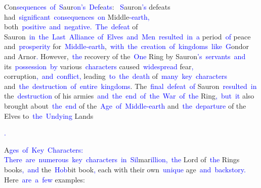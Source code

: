 \documentclass{article}
\begin{document}
\begin{tcolorbox}[colframe=black,colback=white]
{}Con\textcolor{blue}{sequences}\textcolor{blue}{~of}\textcolor{blue}{~S}aur\textcolor{blue}{on}\textcolor{blue}{'s}\textcolor{blue}{~Def}e\textcolor{blue}{ats}:\textcolor{blue}{~
}\textcolor{blue}{S}auron\textcolor{blue}{'s} defeats had\textcolor{blue}{~significant}\textcolor{blue}{~consequences}\textcolor{blue}{~on} Middle\textcolor{blue}{-earth}\textcolor{blue}{,} both\textcolor{blue}{~positive}\textcolor{blue}{~and}\textcolor{blue}{~negative}\textcolor{blue}{.}\textcolor{blue}{~The}\textcolor{blue}{~defeat} of Sauron\textcolor{blue}{~in}\textcolor{blue}{~the}\textcolor{blue}{~Last}\textcolor{blue}{~Alliance}\textcolor{blue}{~of}\textcolor{blue}{~Elves}\textcolor{blue}{~and}\textcolor{blue}{~Men}\textcolor{blue}{~resulted}\textcolor{blue}{~in}\textcolor{blue}{~a} period\textcolor{blue}{~of} peace and\textcolor{blue}{~prosperity} for\textcolor{blue}{~Middle}\textcolor{blue}{-earth},\textcolor{blue}{~with}\textcolor{blue}{~the}\textcolor{blue}{~creation}\textcolor{blue}{~of}\textcolor{blue}{~kingdoms}\textcolor{blue}{~like}\textcolor{blue}{~G}ondor and Arnor\textcolor{blue}{.} However,\textcolor{blue}{~the} recovery of the\textcolor{blue}{~One} Ring by Sauron\textcolor{blue}{'s}\textcolor{blue}{~servants}\textcolor{blue}{~and} its\textcolor{blue}{~possession}\textcolor{blue}{~by} various\textcolor{blue}{~characters} caused\textcolor{blue}{~widespread} fear\textcolor{blue}{,} corruption\textcolor{blue}{,}\textcolor{blue}{~and}\textcolor{blue}{~conflict}\textcolor{blue}{,} leading\textcolor{blue}{~to}\textcolor{blue}{~the}\textcolor{blue}{~death} of\textcolor{blue}{~many}\textcolor{blue}{~key}\textcolor{blue}{~characters} and\textcolor{blue}{~the}\textcolor{blue}{~destruction}\textcolor{blue}{~of}\textcolor{blue}{~entire}\textcolor{blue}{~kingdoms}. The\textcolor{blue}{~final}\textcolor{blue}{~defeat}\textcolor{blue}{~of} Sauron\textcolor{blue}{~resulted}\textcolor{blue}{~in} the\textcolor{blue}{~destruction} of his armies\textcolor{blue}{~and}\textcolor{blue}{~the}\textcolor{blue}{~end}\textcolor{blue}{~of}\textcolor{blue}{~the}\textcolor{blue}{~War}\textcolor{blue}{~of}\textcolor{blue}{~the} Ring\textcolor{blue}{,}\textcolor{blue}{~but}\textcolor{blue}{~it} also brought about\textcolor{blue}{~the}\textcolor{blue}{~end} of the\textcolor{blue}{~Age}\textcolor{blue}{~of}\textcolor{blue}{~Middle}\textcolor{blue}{-earth} and\textcolor{blue}{~the}\textcolor{blue}{~departure} of the Elves to\textcolor{blue}{~the}\textcolor{blue}{~Und}\textcolor{blue}{ying} Lands\textcolor{blue}{.

}A\textcolor{blue}{ges}\textcolor{blue}{~of}\textcolor{blue}{~Key}\textcolor{blue}{~Characters}\textcolor{blue}{:}\textcolor{blue}{~
}\textcolor{blue}{There}\textcolor{blue}{~are}\textcolor{blue}{~numerous}\textcolor{blue}{~key}\textcolor{blue}{~characters}\textcolor{blue}{~in}\textcolor{blue}{~Sil}mar\textcolor{blue}{illion}\textcolor{blue}{,}\textcolor{blue}{~the} Lord of\textcolor{blue}{~the} Rings books\textcolor{blue}{,}\textcolor{blue}{~and} the\textcolor{blue}{~Hob}bit book\textcolor{blue}{,} each with their own\textcolor{blue}{~unique} age\textcolor{blue}{~and}\textcolor{blue}{~backstory}\textcolor{blue}{.} Here\textcolor{blue}{~are}\textcolor{blue}{~a}\textcolor{blue}{~few} examples:\textcolor{blue}{~

}
\end{tcolorbox}
\end{document}

